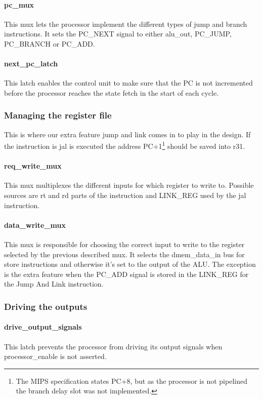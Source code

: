 \paragraph{pc\_mux} This mux lets the processor implement the different types of jump 
and branch instructions. It sets the PC\_NEXT signal to either alu\_out, PC\_JUMP, PC\_BRANCH or PC\_ADD. 

\paragraph{next\_pc\_latch} This latch enables the control unit to make sure that the PC 
is not incremented before the processor reaches the state fetch in the start of each cycle. 

\subsubsection{Managing the register file}

This is where our extra feature jump and link comes in to play in the design. If the instruction 
is jal is executed the address PC+1\footnote{The MIPS specification states PC+8, but as the processor 
is not pipelined the branch delay slot was not implemented.} should be saved into r31.

\paragraph{req\_write\_mux} This mux multiplexes the different inputs for which register to write to. 
Possible sources are rt and rd parts of the instruction and LINK\_REG used by the jal instruction. 

\paragraph{data\_write\_mux} This mux is responsible for choosing the correct input to write to the 
register selected by the previous described mux. It selects the dmem\_data\_in bus for store instructions 
and otherwise it's set to the output of the ALU. The exception is the extra feature when the PC\_ADD signal 
is stored in the LINK\_REG for the Jump And Link instruction.

\subsubsection{Driving the outputs}

\paragraph{drive\_output\_signals} This latch prevents the processor from driving its 
output signals when processor\_enable is not asserted. 

